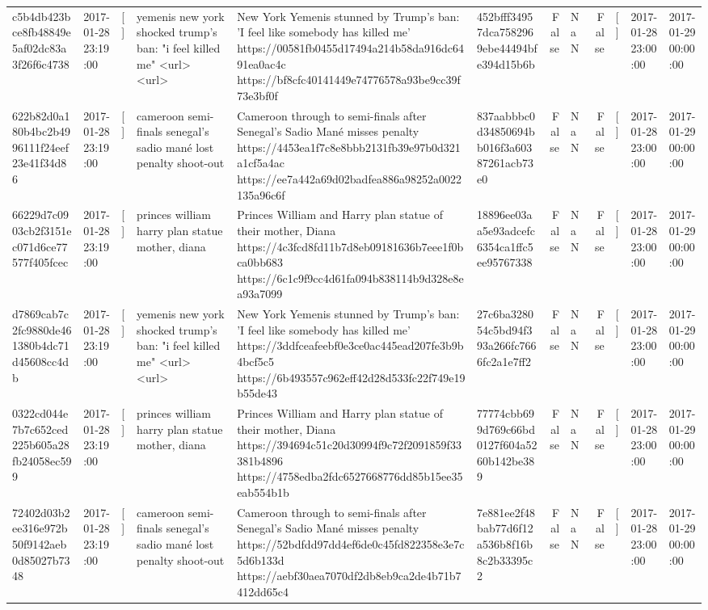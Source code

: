 \begin{tabular}{llllllrlrlll}
c5b4db423bce8fb48849e5af02dc83a3f26f6c4738 & 2017-01-28 23:19:00 & [] & yemenis new york shocked trump's ban: "i feel killed me" <url> <url> & New York Yemenis stunned by Trump's ban: 'I feel like somebody has killed me' https://00581fb0455d17494a214b58da916dc6491ea0ac4c https://bf8cfc40141449e74776578a93be9cc39f73e3bf0f & 452bfff34957dca7582969ebe44494bfe394d15b6b & False & NaN & False & [] & 2017-01-28 23:00:00 & 2017-01-29 00:00:00 \\
622b82d0a180b4bc2b4996111f24eef23e41f34d86 & 2017-01-28 23:19:00 & [] & cameroon semi-finals senegal's sadio mané lost penalty shoot-out & Cameroon through to semi-finals after Senegal’s Sadio Mané misses penalty https://4453ea1f7c8e8bbb2131fb39e97b0d321a1cf5a4ac https://ee7a442a69d02badfea886a98252a0022135a96c6f & 837aabbbc0d34850694bb016f3a60387261acb73e0 & False & NaN & False & [] & 2017-01-28 23:00:00 & 2017-01-29 00:00:00 \\
66229d7c0903cb2f3151ec071d6ce77577f405fcec & 2017-01-28 23:19:00 & [] & princes william harry plan statue mother, diana & Princes William and Harry plan statue of their mother, Diana https://4c3fcd8fd11b7d8eb09181636b7eee1f0bca0bb683 https://6c1c9f9cc4d61fa094b838114b9d328e8ea93a7099 & 18896ee03aa5e93adcefc6354ca1ffc5ee95767338 & False & NaN & False & [] & 2017-01-28 23:00:00 & 2017-01-29 00:00:00 \\
d7869cab7c2fc9880de461380b4dc71d45608cc4db & 2017-01-28 23:19:00 & [] & yemenis new york shocked trump's ban: "i feel killed me" <url> <url> & New York Yemenis stunned by Trump's ban: 'I feel like somebody has killed me' https://3ddfceafeebf0e3ce0ac445ead207fe3b9b4bcf5c5 https://6b493557c962eff42d28d533fc22f749e19b55de43 & 27c6ba328054c5bd94f393a266fc7666fc2a1e7ff2 & False & NaN & False & [] & 2017-01-28 23:00:00 & 2017-01-29 00:00:00 \\
0322cd044e7b7c652ced225b605a28fb24058ec599 & 2017-01-28 23:19:00 & [] & princes william harry plan statue mother, diana & Princes William and Harry plan statue of their mother, Diana https://394694c51c20d30994f9c72f2091859f33381b4896 https://4758edba2fdc6527668776dd85b15ee35eab554b1b & 77774cbb699d769c66bd0127f604a5260b142be389 & False & NaN & False & [] & 2017-01-28 23:00:00 & 2017-01-29 00:00:00 \\
72402d03b2ee316e972b50f9142aeb0d85027b7348 & 2017-01-28 23:19:00 & [] & cameroon semi-finals senegal's sadio mané lost penalty shoot-out & Cameroon through to semi-finals after Senegal’s Sadio Mané misses penalty https://52bdfdd97dd4ef6de0c45fd822358e3e7c5d6b133d https://aebf30aea7070df2db8eb9ca2de4b71b7412dd65c4 & 7e881ee2f48bab77d6f12a536b8f16b8c2b33395c2 & False & NaN & False & [] & 2017-01-28 23:00:00 & 2017-01-29 00:00:00 \\

\end{tabular}

